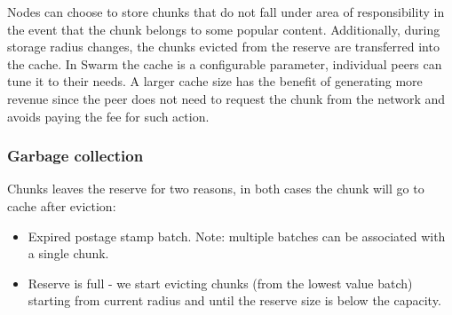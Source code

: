 Nodes can choose to store chunks that do not fall under area of responsibility in the event that the chunk belongs to some popular content. Additionally, during storage radius changes, the chunks evicted from the reserve are transferred into the cache. In Swarm the cache is a configurable parameter, individual peers can tune it to their needs. A larger cache size has the benefit of generating more revenue since the peer does not need to request the chunk from the network and avoids paying the fee for such action.

\subsubsection{Garbage collection}\label{garbage-collection}

Chunks leaves the reserve for two reasons, in both cases the chunk will go to cache after eviction:
\begin{itemize}
\tightlist
\item
  Expired postage stamp batch. Note: multiple batches can be associated with a single chunk.
\item
  Reserve is full - we start evicting chunks (from the lowest value batch) starting from current radius and until the reserve size is below the capacity.
\end{itemize}